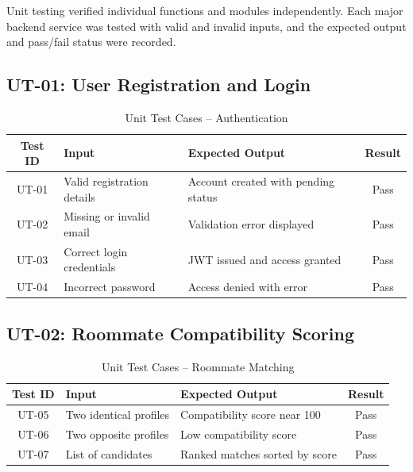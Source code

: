 Unit testing verified individual functions and modules independently. Each major backend service was tested with valid and invalid inputs, and the expected output and pass/fail status were recorded.

\subsection{UT-01: User Registration and Login}

\begin{table}[h]
\centering
\caption{Unit Test Cases – Authentication}
\begin{tabularx}{\textwidth}{|c|X|X|c|}
\hline
\textbf{Test ID} & \textbf{Input} & \textbf{Expected Output} & \textbf{Result} \\
\hline
UT-01 & Valid registration details & Account created with pending status & Pass \\
\hline
UT-02 & Missing or invalid email & Validation error displayed & Pass \\
\hline
UT-03 & Correct login credentials & JWT issued and access granted & Pass \\
\hline
UT-04 & Incorrect password & Access denied with error & Pass \\
\hline
\end{tabularx}
\end{table}

\subsection{UT-02: Roommate Compatibility Scoring}

\begin{table}[h]
\centering
\caption{Unit Test Cases – Roommate Matching}
\begin{tabularx}{\textwidth}{|c|X|X|c|}
\hline
\textbf{Test ID} & \textbf{Input} & \textbf{Expected Output} & \textbf{Result} \\
\hline
UT-05 & Two identical profiles & Compatibility score near 100 & Pass \\
\hline
UT-06 & Two opposite profiles & Low compatibility score & Pass \\
\hline
UT-07 & List of candidates & Ranked matches sorted by score & Pass \\
\hline
\end{tabularx}
\end{table}


